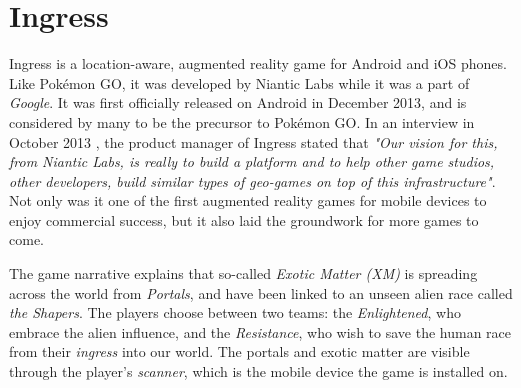 \section{Ingress}
\label{sec:ingress}

Ingress is a location-aware, augmented reality game for Android and iOS phones. Like Pokémon GO, it was developed by Niantic Labs while it was a part of \emph{Google}. It was first officially released on Android in December 2013, and is considered by many to be the precursor to Pokémon GO. In an interview in October 2013 \cite{gamasutraBadger}, the product manager of Ingress stated that \emph{"Our vision for this, from Niantic Labs, is really to build a platform and to help other game studios, other developers, build similar types of geo-games on top of this infrastructure"}. Not only was it one of the first augmented reality games for mobile devices to enjoy commercial success, but it also laid the groundwork for more games to come.

The game narrative explains that so-called \emph{Exotic Matter (XM)} is spreading across the world from \emph{Portals}, and have been linked to an unseen alien race called \emph{the Shapers}. The players choose between two teams: the \emph{Enlightened}, who embrace the alien influence, and the \emph{Resistance}, who wish to save the human race from their \emph{ingress} into our world. The portals and exotic matter are visible through the player's \emph{scanner}, which is the mobile device the game is installed on.

